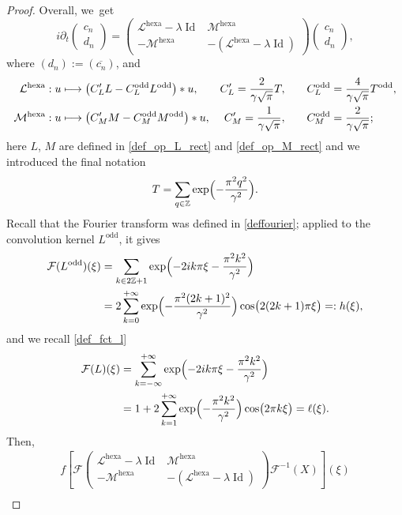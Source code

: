 \documentclass[10pt]{amsart}
\newcommand\mto{\mathchoice{\longmapsto}{\mapsto}{\mapsto}{\mapsto}}
\DeclareMathOperator{\Id}{Id}
\theoremstyle{definition}
\let\EE\exp
\let\ov\overline
\newcommand\Z{\mathbb Z}
\newcommand{\pa}[1]{\left(#1\right)}
\newcommand{\pac}[1]{\left[#1\right]}
\begin{document}
\begin{proof}
Overall, we~get
\begin{equation*}
i\partial_t \begin{pmatrix} c_n \\[2pt] d_n \end{pmatrix} = \begin{pmatrix} \mathcal{L}^{\text{hexa}}-\lambda \Id & \mathcal{M}^{\text{hexa}} \\[2pt] -\mathcal{M}^{\text{hexa}} & - (\mathcal{L}^{\text{hexa}}-\lambda \Id) \end{pmatrix} \begin{pmatrix} c_n \\[2pt] d_n \end{pmatrix},
\end{equation*}
where $(d_n):= (\ov{c_n})$, and
\begin{align*}
\mathcal{L}^{\text{hexa}} &: u \mto \pa{C_L' L- C_L^{\text{odd}}L^{\text{odd}}}* u, &C'_L=\frac{2}{\gamma\sqrt{\pi}}T, \qquad &C_L^{\text{odd}}=\frac{4}{\gamma\sqrt{\pi}}T^{\text{odd}},\\
\mathcal{M}^{\text{hexa}} &: u \mto \pa{C_M' M- C_M^{\text{odd}}M^{\text{odd}}}* u, &C'_M=\frac{1}{\gamma\sqrt{\pi}}, \qquad &C_M^{\text{odd}}=\frac{2}{\gamma\sqrt{\pi}};
\end{align*}
here $L$, $M$ are defined in \eqref{def_op_L_rect} and \eqref{def_op_M_rect} and we introduced the final notation
\[
T= \sum_{q \in \Z} \EE\Bigl(-\frac{\pi^2 q^2} {\gamma^2}\Bigr).
\]
Recall that the Fourier transform was defined in \eqref{deffourier}; applied to the convolution kernel $L^{\text{odd}}$, it gives
\begin{align}\label{def_fct_h}
\mathcal{F}(L^{\text{odd}})(\xi) &= \sum_{k \in 2\Z+1} \EE\Bigl(-2ik\pi \xi-\frac{\pi^2 k^2}{\gamma^2}\Bigr) \nonumber \\
&=2 \sum_{k=0}^{+\infty}\EE\Bigl(-\frac{\pi^2(2k+1)^2}{\gamma^2}\Bigr)\cos\bigl({2(2k+1)\pi \xi}\bigr)=: h(\xi),
\end{align}
and we recall \eqref{def_fct_l}
\begin{align}\label{def_fct_lb}
\mathcal{F}(L)(\xi) &= \sum_{k = -\infty}^{+\infty} \EE\Bigl(-2ik\pi \xi-\frac{\pi^2 k^2} {\gamma^2}\Bigr)\nonumber \\
&=1 + 2 \sum_{k=1}^{+\infty}\EE\Bigl({-\frac{\pi^2k^2}{\gamma^2}}\Bigr) \cos\bigl({2\pi k\xi}\bigr)= \ell(\xi).
\end{align}
Then,
\begin{multline}\label{defA}f
\pac{\mathcal{F}\begin{pmatrix} \mathcal{L}^{\text{hexa}}-\lambda \Id & \mathcal{M}^{\text{hexa}} \\[2pt] -\mathcal{M}^{\text{hexa}} & - (\mathcal{L}^{\text{hexa}}-\lambda \Id) \end{pmatrix}\mathcal{F}^{-1}(X)}\pa{\xi}\\

\end{multline}
\end{proof}
\end{document}
